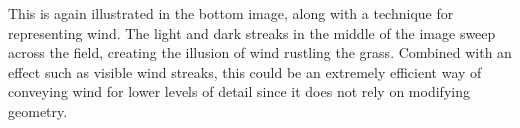 \documentclass[notitlepage]{report}
\begin{document}
This is again illustrated in the bottom image, along with a technique for representing wind. The light and dark streaks in the middle of the image sweep across the field, creating the illusion of wind rustling the grass. Combined with an effect such as visible wind streaks, this could be an extremely efficient way of conveying wind for lower levels of detail since it does not rely on modifying geometry.




\end{document}
